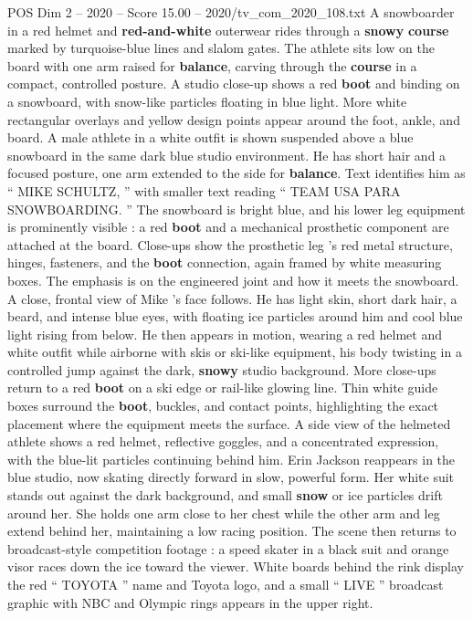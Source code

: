 \begin{textsample}{POS Dim 2 – 2020 – Score 15.00 – 2020/tv\_com\_2020\_108.txt}
A snowboarder in a red helmet and \textbf{red-and-white} outerwear rides through a \textbf{snowy} \textbf{course} marked by turquoise-blue lines and slalom gates.
The athlete sits low on the board with one arm raised for \textbf{balance}, carving through the \textbf{course} in a compact, controlled posture.
A studio close-up shows a red \textbf{boot} and binding on a snowboard, with snow-like particles floating in blue light.
More white rectangular overlays and yellow design points appear around the foot, ankle, and board.
A male athlete in a white outfit is shown suspended above a blue snowboard in the same dark blue studio environment.
He has short hair and a focused posture, one arm extended to the side for \textbf{balance}.
Text identifies him as “ MIKE SCHULTZ, ” with smaller text reading “ TEAM USA PARA SNOWBOARDING. ” The snowboard is bright blue, and his lower leg equipment is prominently visible : a red \textbf{boot} and a mechanical prosthetic component are attached at the board.
Close-ups show the prosthetic leg ’s red metal structure, hinges, fasteners, and the \textbf{boot} connection, again framed by white measuring boxes.
The emphasis is on the engineered joint and how it meets the snowboard.
A close, frontal view of Mike ’s face follows.
He has light skin, short dark hair, a beard, and intense blue eyes, with floating ice particles around him and cool blue light rising from below.
He then appears in motion, wearing a red helmet and white outfit while airborne with skis or ski-like equipment, his body twisting in a controlled jump against the dark, \textbf{snowy} studio background.
More close-ups return to a red \textbf{boot} on a ski edge or rail-like glowing line.
Thin white guide boxes surround the \textbf{boot}, buckles, and contact points, highlighting the exact placement where the equipment meets the surface.
A side view of the helmeted athlete shows a red helmet, reflective goggles, and a concentrated expression, with the blue-lit particles continuing behind him.
Erin Jackson reappears in the blue studio, now skating directly forward in slow, powerful form.
Her white suit stands out against the dark background, and small \textbf{snow} or ice particles drift around her.
She holds one arm close to her chest while the other arm and leg extend behind her, maintaining a low racing position.
The scene then returns to broadcast-style competition footage : a speed skater in a black suit and orange visor races down the ice toward the viewer.
White boards behind the rink display the red “ TOYOTA ” name and Toyota logo, and a small “ LIVE ” broadcast graphic with NBC and Olympic rings appears in the upper right.

\end{textsample}
